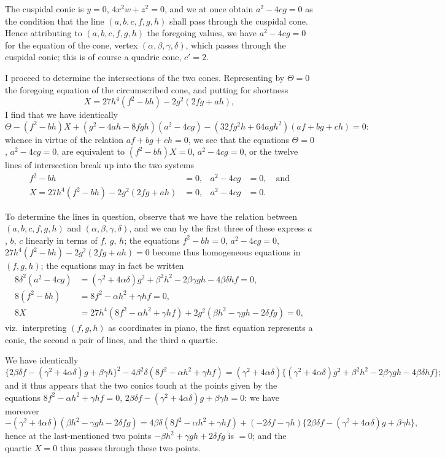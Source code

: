 \documentclass[11pt,a4paper]{article}
\theoremstyle{definition}
\begin{document}
The cuspidal conic is $y=0$, $4x^2w+z^2=0$, and we at once obtain $a^2-4cg=0$ as the condition that the line $(a,b,c,f,g,h)$ shall pass through the cuspidal cone. Hence attributing to $(a,b,c,f,g,h)$ the foregoing values, we have $a^2-4cg=0$ for the equation of the cone, vertex $(\alpha,\beta,\gamma,\delta)$, which passes through the cuspidal conic; this is of course a quadric cone, $c'=2$.

\setcounter{page}{453}

I proceed to determine the intersections of the two cones. Representing by $\Theta=0$ the foregoing equation of the circumscribed cone, and putting for shortness
\[
X=27h^4(f^2-bh)-2g^2(2fg+ah),
\]
I find that we have identically
\[
\Theta - (f^2-bh)X + (g^2-4ah-8fgh)(a^2-4cg) - (32fg^2h+64agh^2)(af+bg+ch)=0:
\]
whence in virtue of the relation $af+bg+ch=0$, we see that the equations $\Theta=0$, $a^2-4cg=0$, are equivalent to $(f^2-bh)X=0$, $a^2-4cg=0$, or the twelve lines of intersection break up into the two systems
\begin{align*}
f^2-bh&=0, & a^2-4cg&=0, \quad \text{and} \\
X=27h^4(f^2-bh)-2g^2(2fg+ah)&=0, & a^2-4cg&=0.
\end{align*}

\setcounter{page}{454}

To determine the lines in question, observe that we have the relation between $(a,b,c,f,g,h)$ and $(\alpha,\beta,\gamma,\delta)$, and we can by the first three of these express $a$, $b$, $c$ linearly in terms of $f$, $g$, $h$; the equations $f^2-bh=0$, $a^2-4cg=0$, $27h^4(f^2-bh)-2g^2(2fg+ah)=0$ become thus homogeneous equations in $(f,g,h)$; the equations may in fact be written
\begin{align*}
8\delta^2(a^2-4cg) &= (\gamma^2+4\alpha\delta)g^2+\beta^2h^2-2\beta\gamma gh-4\beta\delta hf=0,\\
8(f^2-bh) &= 8f^2-\alpha h^2+\gamma hf=0,\\
8X &= 27h^4(8f^2-\alpha h^2+\gamma hf)+2g^2(\beta h^2-\gamma gh-2\delta fg)=0,
\end{align*}
viz.\ interpreting $(f,g,h)$ as coordinates in piano, the first equation represents a conic, the second a pair of lines, and the third a quartic.

\setcounter{page}{455}

We have identically
\[
\{2\beta\delta f-(\gamma^2+4\alpha\delta)g+\beta\gamma h\}^2-4\beta^2\delta(8f^2-\alpha h^2+\gamma hf) = (\gamma^2+4\alpha\delta)\{(\gamma^2+4\alpha\delta)g^2+\beta^2h^2-2\beta\gamma gh-4\beta\delta hf\};
\]
and it thus appears that the two conics touch at the points given by the equations $8f^2-\alpha h^2+\gamma hf=0$, $2\beta\delta f-(\gamma^2+4\alpha\delta)g+\beta\gamma h=0$: we have moreover
\[
-(\gamma^2+4\alpha\delta)(\beta h^2-\gamma gh-2\delta fg) = 4\beta\delta(8f^2-\alpha h^2+\gamma hf) + (-2\delta f-\gamma h)\{2\beta\delta f-(\gamma^2+4\alpha\delta)g+\beta\gamma h\},
\]
hence at the last-mentioned two points $-\beta h^2+\gamma gh+2\delta fg$ is $=0$; and the quartic $X=0$ thus passes through these two points.
\end{document}
